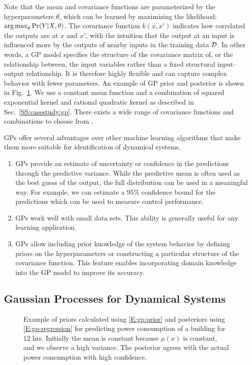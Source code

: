 Note that the mean and covariance functions are parameterized by the hyperparameters $\theta$, which can be learned by maximizing the likelihood: \(\operatorname*{arg\,max}_\theta \Pr(Y \vert X, \theta)\).
The covariance function \(k(x,x')\) indicates how correlated the outputs are at \(x\) and \(x'\), with the intuition that the output at an input is influenced more by the outputs of nearby inputs in the training data $\mathcal{D}$.
In other words, a GP model specifies the structure of the covariance matrix of, or the relationship between, the input variables rather than a fixed structural input--output relationship.
It is therefore highly flexible and can capture complex behavior with fewer parameters.
An example of GP prior and posterior is shown in Fig.~\ref{F:gp:prior:posterior}. We use a constant mean function and a combination of squared exponential kernel and rational quadratic kernel as described in Sec.~\ref{SS:casestudy:gp}.
There exists a wide range of covariance functions and combinations to choose from \cite{Rasmussen2006}. 

GPs offer several advantages over other machine learning algorithms that make them more suitable for identification of dynamical systems.
\begin{enumerate}
\item GPs provide an estimate of uncertainty or confidence in the
  predictions through the predictive variance.  While the predictive mean is often used as the best guess of the output, the full distribution can be used in a meaningful way. For example, we can estimate a 95\% confidence bound for the predictions which can be used to measure control performance.
\item GPs work well with small data sets.  This ability is generally useful for any learning application.
\item GPs allow including prior knowledge of the system behavior by defining priors on the hyperparameters or constructing a particular structure of the covariance function.  This feature enables incorporating domain knowledge into the GP model to improve its accuracy.
\end{enumerate}

\subsection{Gaussian Processes for Dynamical Systems}
\label{SS:intro-gp:control}

\begin{figure}[!tb]
	\centering
	\setlength{}
	\setlength{}	
	
	\caption{Example of priors calculated using \eqref{E:gp:prior} and posteriors using \eqref{E:gp-regression} for predicting power consumption of a building for \(12\) hrs. Initially the mean is constant because \(\mu(x)\) is constant, and we observe a high variance. The posterior agrees with the actual power consumption with high confidence.}
	\label{F:gp:prior:posterior}
\end{figure}

